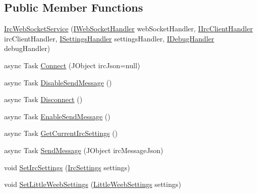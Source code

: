 \subsection*{Public Member Functions}
\begin{DoxyCompactItemize}
\item 
\mbox{\hyperlink{class_little_weeb_library_1_1_services_1_1_irc_web_socket_service_a3265383962fc71a18b9a6fa0c4c84797}{Irc\+Web\+Socket\+Service}} (\mbox{\hyperlink{interface_little_weeb_library_1_1_handlers_1_1_i_web_socket_handler}{I\+Web\+Socket\+Handler}} web\+Socket\+Handler, \mbox{\hyperlink{interface_little_weeb_library_1_1_handlers_1_1_i_irc_client_handler}{I\+Irc\+Client\+Handler}} irc\+Client\+Handler, \mbox{\hyperlink{interface_little_weeb_library_1_1_handlers_1_1_i_settings_handler}{I\+Settings\+Handler}} settings\+Handler, \mbox{\hyperlink{interface_little_weeb_library_1_1_handlers_1_1_i_debug_handler}{I\+Debug\+Handler}} debug\+Handler)
\item 
async Task \mbox{\hyperlink{class_little_weeb_library_1_1_services_1_1_irc_web_socket_service_ad5592055f57beed1a26d76ee1a518af5}{Connect}} (J\+Object irc\+Json=null)
\item 
async Task \mbox{\hyperlink{class_little_weeb_library_1_1_services_1_1_irc_web_socket_service_a71f89c2a8e9b0a86972d192bc3e55318}{Disable\+Send\+Message}} ()
\item 
async Task \mbox{\hyperlink{class_little_weeb_library_1_1_services_1_1_irc_web_socket_service_a637703e827e16a5d99055119bfe62972}{Disconnect}} ()
\item 
async Task \mbox{\hyperlink{class_little_weeb_library_1_1_services_1_1_irc_web_socket_service_acd9aa44a2389caa8e997db49a646c448}{Enable\+Send\+Message}} ()
\item 
async Task \mbox{\hyperlink{class_little_weeb_library_1_1_services_1_1_irc_web_socket_service_a9add76a72fff82d5b7009d34620516dd}{Get\+Current\+Irc\+Settings}} ()
\item 
async Task \mbox{\hyperlink{class_little_weeb_library_1_1_services_1_1_irc_web_socket_service_aa9fcd18dc123e1356049b4b95bbaf2ff}{Send\+Message}} (J\+Object irc\+Message\+Json)
\item 
void \mbox{\hyperlink{class_little_weeb_library_1_1_services_1_1_irc_web_socket_service_a6476ee44ddf292f916b20085c03af5eb}{Set\+Irc\+Settings}} (\mbox{\hyperlink{class_little_weeb_library_1_1_settings_1_1_irc_settings}{Irc\+Settings}} settings)
\item 
void \mbox{\hyperlink{class_little_weeb_library_1_1_services_1_1_irc_web_socket_service_a48697b5d89c2899e73d1ecf7492bd083}{Set\+Little\+Weeb\+Settings}} (\mbox{\hyperlink{class_little_weeb_library_1_1_settings_1_1_little_weeb_settings}{Little\+Weeb\+Settings}} settings)
\end{DoxyCompactItemize}
